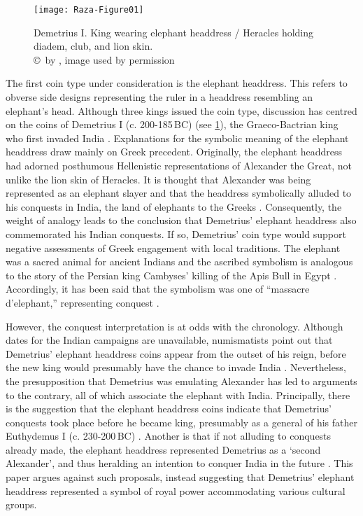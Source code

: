 \documentclass{ijsra}
\renewcommand\BC{{\,BC\xspace}}
\begin{document}
\begin{figure}[!htb] %
	\centering
	\texttt{[image: Raza-Figure01]}
	\caption{Demetrius I. King wearing elephant headdress / Heracles holding diadem, club, and lion skin.
		{\normalfont\scriptsize \\ \copyright\ by \cite{Coin}, image used by permission}}
	\label{fig:Raza-Figure01}
\end{figure}

The first coin type under consideration is the elephant headdress.
This refers to obverse side designs representing the ruler in a headdress resembling an elephant's head.
Although three kings issued the coin type, discussion has centred on the coins of Demetrius I
(c. 200-185\BC) (see \cref{fig:Raza-Figure01}), the Graeco-Bactrian king who first invaded India \parencites[47--48]{Bopearachchi2011}[17--18]{Kalita1997}.
Explanations for the symbolic meaning of the elephant headdress draw mainly on Greek precedent. Originally, the elephant headdress had adorned posthumous Hellenistic representations of Alexander the Great, not unlike the lion skin of Heracles. It is thought that Alexander was being represented as an elephant slayer and that the headdress symbolically alluded to his conquests in India, the land of elephants to the Greeks \parencites[50]{Curtis2007}[335]{Green1993}[104--105]{MacDowall2007a}.
Consequently, the weight of analogy leads to the conclusion that Demetrius’ elephant headdress also commemorated his Indian conquests. If so, Demetrius’ coin type would support negative assessments of Greek engagement with local traditions. The elephant was a sacred animal for ancient Indians and the ascribed symbolism is analogous to the story of the Persian king Cambyses’ killing of the Apis Bull in Egypt \parencite[11--19]{Gupta1983}. Accordingly, it has been said that the symbolism was one of “massacre d’elephant,” representing conquest \parencite[492]{Widemann2009}.

However, the conquest interpretation is at odds with the chronology. Although dates for the Indian campaigns are unavailable, numismatists point out that Demetrius’ elephant headdress coins appear from the outset of his reign, before the new king would presumably have the chance to invade India \parencite[157]{Holt2012}.
Nevertheless, the presupposition that Demetrius was emulating Alexander has led to arguments to the contrary, all of which associate the elephant with India.
Principally, there is the suggestion that the elephant headdress coins indicate that Demetrius’ conquests took place before he became king, presumably as a general of his father Euthydemus I (c. 230-200\BC) \parencite[157]{Holt2012}.
Another is that if not alluding to conquests already made, the elephant headdress represented Demetrius as a ‘second Alexander’, and thus heralding an intention to conquer India in the future \parencites[190]{Sidky2000}[132]{Tarn1951}.
This paper argues against such proposals, instead suggesting that Demetrius’ elephant headdress represented a symbol of royal power accommodating various cultural groups.
\end{document}
